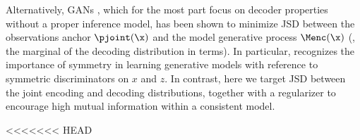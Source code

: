 Alternatively,  GANs \cite{NIPS2014_5423}, which for the most part focus on decoder properties without a proper inference model,
has been shown to minimize JSD between the observations anchor $\pjoint(\x)$ and the model generative process $\Menc(\x)$ (\ie, the marginal of the decoding distribution in \MIM terms). 
In particular, \citep{DonahueKD16-BiGAN,Bang-BiGAN2018} recognizes the importance of symmetry in learning generative models with reference to symmetric discriminators on $x$ and $z$. In contrast, here we target JSD between the joint encoding and decoding distributions, together with a regularizer to encourage high mutual information within a consistent model.

<<<<<<< HEAD
    
    



